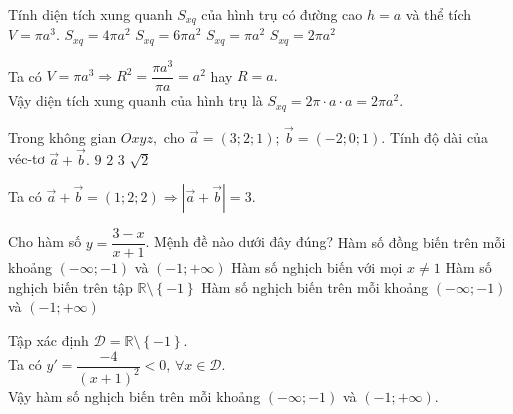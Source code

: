 \begin{ex}%
Tính diện tích xung quanh $ S_{xq} $	của hình trụ có đường cao $ h = a $ và thể tích $ V = \pi a^3. $
	\choice
	{$ S_{xq} = 4 \pi a^2 $}
	{$ S_{xq} = 6 \pi a^2 $}
	{ $ S_{xq} =  \pi a^2 $}
	{\True $ S_{xq} = 2 \pi a^2 $}
	\loigiai
	{Ta có $ V = \pi a^3 \Rightarrow R^2 = \dfrac{\pi a^3}{\pi a} = a^2 $ hay $ R = a. $\\
		Vậy diện tích xung quanh của hình trụ là $ S_{xq} = 2\pi \cdot a \cdot a = 2\pi a^2. $
		
	}
\end{ex}

\begin{ex}%
Trong không gian $ Oxyz, $	cho $ \vec{a} = (3;2;1) $; $ \vec{b} = (-2;0;1) $. Tính độ dài của véc-tơ $ \vec{a} + \vec{b}. $
	\choice
	{$ 9 $}
	{$ 2 $}
	{\True $ 3 $}
	{$ \sqrt{2} $}
	\loigiai
	{Ta có $ \vec{a} + \vec{b} = \left(1;2;2\right) \Rightarrow \left| \vec{a} + \vec{b} \right| = 3. $
		
	}
\end{ex}

\begin{ex}%
Cho hàm số $ y = \dfrac{3-x}{x+1} $. Mệnh đề nào dưới đây đúng?
	\choice
	{Hàm số đồng biến trên mỗi khoảng $ \left(-\infty; -1\right) $ và $ \left(-1; +\infty \right) $}
	{Hàm số nghịch biến với mọi $ x \ne 1 $}
	{Hàm số nghịch biến trên tập $ \mathbb{R} \setminus \left\{-1\right\} $}
	{\True Hàm số nghịch biến trên mỗi khoảng $ \left(-\infty; -1\right) $ và $ \left(-1; +\infty \right) $}
	\loigiai
	{Tập xác định $ \mathscr D = \mathbb{R} \setminus \left\{-1\right\} $.\\
		Ta có $ y' = \dfrac{-4}{\left(x+1\right)^2} < 0,\, \forall x \in \mathscr D. $\\
		Vậy hàm số nghịch biến trên mỗi khoảng $ \left(-\infty; -1\right) $ và $ \left(-1; +\infty \right) $.
		
	}
\end{ex}

